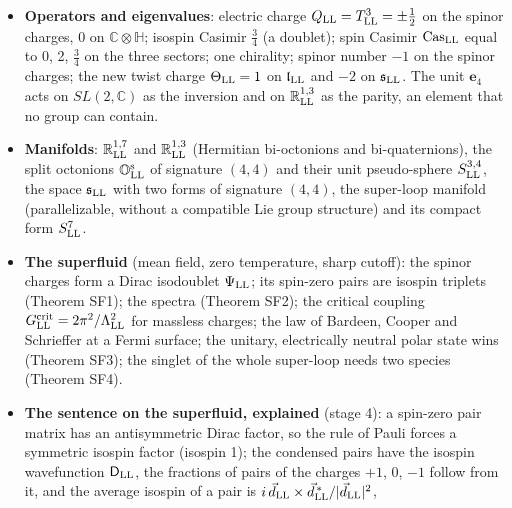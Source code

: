 \documentclass[
  10pt,
]{article}
\begin{document}
\begin{itemize}
  \(\mathcal F^{\rm B}_{\rm LL}\), \(\mathcal F^{\rm C}_{\rm LL}\)), the
  super-loop is the unique Malcev algebra in which spinor charges close
  into Lorentz generators; the twist can only be
  \(c^{\rm tw}_{\rm LL}=0\), \(1\) or \(-2\); with translations no
  Malcev algebra of the families does it; isospin can act on the
  super-loop only from outside, by automorphisms.
\item
  \textbf{Operators and eigenvalues}: electric charge
  \(Q_{\rm LL}=T^3_{\rm LL}=\pm\tfrac12\) on the spinor charges, 0 on
  \(\mathbb C\otimes\mathbb H\); isospin Casimir \(\tfrac34\) (a
  doublet); spin Casimir \(\mathrm{Cas}_{\rm LL}\) equal to 0, 2,
  \(\tfrac34\) on the three sectors; one chirality; spinor number \(-1\)
  on the spinor charges; the new twist charge \(\Theta_{\rm LL}=1\) on
  \(\mathfrak l_{\rm LL}\) and \(-2\) on \(\mathfrak s_{\rm LL}\). The
  unit \(\mathbf e_4\) acts on \(SL(2,\mathbb C)\) as the inversion and
  on \(\mathbb R^{1,3}_{\rm LL}\) as the parity, an element that no
  group can contain.
\item
  \textbf{Manifolds}: \(\mathbb R^{1,7}_{\rm LL}\) and
  \(\mathbb R^{1,3}_{\rm LL}\) (Hermitian bi-octonions and
  bi-quaternions), the split octonions \(\mathbb O^{\rm s}_{\rm LL}\) of
  signature \((4,4)\) and their unit pseudo-sphere \(S^{3,4}_{\rm LL}\),
  the space \(\mathfrak s_{\rm LL}\) with two forms of signature
  \((4,4)\), the super-loop manifold (parallelizable, without a
  compatible Lie group structure) and its compact form \(S^7_{\rm LL}\).
\item
  \textbf{The superfluid} (mean field, zero temperature, sharp cutoff):
  the spinor charges form a Dirac isodoublet \(\Psi_{\rm LL}\); its
  spin-zero pairs are isospin triplets (Theorem SF1); the spectra
  (Theorem SF2); the critical coupling
  \(G^{\rm crit}_{\rm LL}=2\pi^2/\Lambda_{\rm LL}^2\) for massless
  charges; the law of Bardeen, Cooper and Schrieffer at a Fermi surface;
  the unitary, electrically neutral polar state wins (Theorem SF3); the
  singlet of the whole super-loop needs two species (Theorem SF4).
\item
  \textbf{The sentence on the superfluid, explained} (stage 4): a
  spin-zero pair matrix has an antisymmetric Dirac factor, so the rule
  of Pauli forces a symmetric isospin factor (isospin 1); the condensed
  pairs have the isospin wavefunction \(\mathsf D_{\rm LL}\), the
  fractions of pairs of the charges \(+1\), 0, \(-1\) follow from it,
  and the average isospin of a pair is
  \(i\,\vec d_{\rm LL}\times\vec d^{\,*}_{\rm LL}/\lvert\vec d_{\rm LL}\rvert^2\),

\end{itemize}
\end{document}
